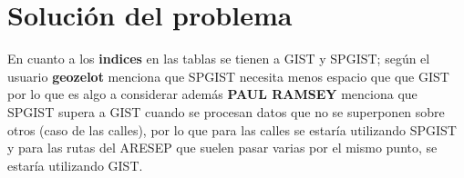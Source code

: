 \section{Solución del problema}


En cuanto a los \textbf{indices} en las tablas se tienen a GIST y SPGIST; según el usuario \textbf{geozelot} menciona que SPGIST necesita menos espacio que que GIST por lo que es algo a considerar además \textbf{PAUL RAMSEY} menciona  que SPGIST supera a GIST cuando se procesan datos que no se superponen sobre otros (caso de las calles), por lo que para las calles se estaría utilizando SPGIST y para las rutas del ARESEP que suelen pasar varias por el mismo punto, se estaría utilizando GIST.

\newpage
